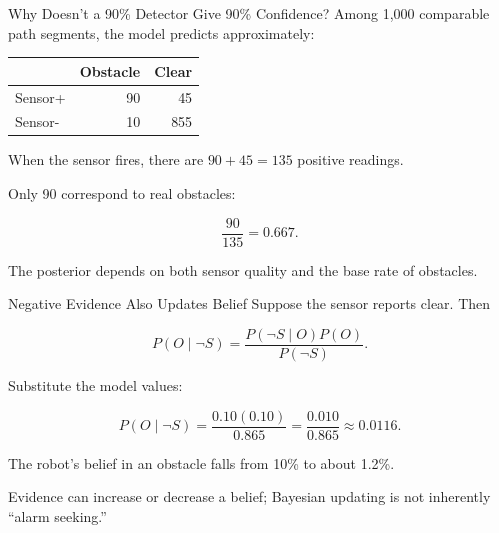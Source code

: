 \documentclass[aspectratio=169,10pt]{beamer}
\begin{document}
\begin{frame}[shrink=10]{Why Doesn't a 90\% Detector Give 90\% Confidence?}
  Among 1,000 comparable path segments, the model predicts approximately:

  \begin{center}
    \renewcommand{\arraystretch}{1.25}
    \begin{tabular}{l|r|r}
      & \textbf{Obstacle} & \textbf{Clear} \\\hline
      Sensor+ & 90 & 45 \\
      Sensor- & 10 & 855
    \end{tabular}
  \end{center}

  When the sensor fires, there are $90+45=135$ positive readings.

  Only 90 correspond to real obstacles:

  \[
    \frac{90}{135}=0.667.
  \]

  \begin{keyidea}
    The posterior depends on both sensor quality and the base rate of obstacles.
  \end{keyidea}
\end{frame}

\begin{frame}[shrink=10]{Negative Evidence Also Updates Belief}
  Suppose the sensor reports clear. Then

  \[
    P(O\mid \neg S)
    =\frac{P(\neg S\mid O)P(O)}{P(\neg S)}.
  \]

  Substitute the model values:

  \[
    P(O\mid \neg S)
    =\frac{0.10(0.10)}{0.865}
    =\frac{0.010}{0.865}
    \approx \boxed{0.0116}.
  \]

  The robot's belief in an obstacle falls from 10\% to about 1.2\%.

  \begin{keyidea}
    Evidence can increase or decrease a belief; Bayesian updating is not inherently ``alarm seeking.''
  \end{keyidea}
\end{frame}
\end{document}
